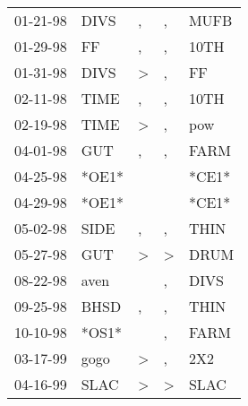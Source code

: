 \begin{supertabular}{p{0.07\textwidth}p{0.06\textwidth}p{0.02\textwidth}p{0.02\textwidth}p{0.06\textwidth}}
 01-21-98\textsuperscript{} &           DIVS\textsuperscript{} &             , &             , &  MUFB\textsuperscript{} \\
 01-29-98\textsuperscript{} &             FF\textsuperscript{} &             , &             , &  10TH\textsuperscript{} \\
 01-31-98\textsuperscript{} &           DIVS\textsuperscript{} &  \textgreater &             , &    FF\textsuperscript{} \\
 02-11-98\textsuperscript{} &           TIME\textsuperscript{} &             , &             , &  10TH\textsuperscript{} \\
 02-19-98\textsuperscript{} &           TIME\textsuperscript{} &  \textgreater &             , &   pow\textsuperscript{} \\
 04-01-98\textsuperscript{} &            GUT\textsuperscript{} &             , &             , &  FARM\textsuperscript{} \\
 04-25-98\textsuperscript{} &                            *OE1* &               &               &                   *CE1* \\
 04-29-98\textsuperscript{} &                            *OE1* &               &               &                   *CE1* \\
 05-02-98\textsuperscript{} &           SIDE\textsuperscript{} &             , &             , &  THIN\textsuperscript{} \\
 05-27-98\textsuperscript{} &            GUT\textsuperscript{} &  \textgreater &  \textgreater &  DRUM\textsuperscript{} \\
 08-22-98\textsuperscript{} &           aven\textsuperscript{} &               &             , &  DIVS\textsuperscript{} \\
 09-25-98\textsuperscript{} &           BHSD\textsuperscript{} &             , &             , &  THIN\textsuperscript{} \\
 10-10-98\textsuperscript{} &                            *OS1* &               &             , &  FARM\textsuperscript{} \\
 03-17-99\textsuperscript{} &           gogo\textsuperscript{} &  \textgreater &             , &   2X2\textsuperscript{} \\
 04-16-99\textsuperscript{} &           SLAC\textsuperscript{} &  \textgreater &  \textgreater &  SLAC\textsuperscript{} \\

\end{supertabular}
